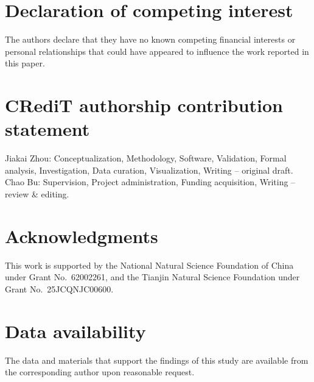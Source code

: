 \documentclass[final,5p,times,twocolumn]{elsarticle/elsarticle}
\begin{document}
\section*{Declaration of competing interest}
The authors declare that they have no known competing financial interests or personal relationships that could have appeared to influence the work reported in this paper.

\section*{CRediT authorship contribution statement}
Jiakai Zhou: Conceptualization, Methodology, Software, Validation, Formal analysis, Investigation, Data curation, Visualization, Writing -- original draft. Chao Bu: Supervision, Project administration, Funding acquisition, Writing -- review \& editing.

\section*{Acknowledgments}
This work is supported by the National Natural Science Foundation of China under Grant No.~62002261, and the Tianjin Natural Science Foundation under Grant No.~25JCQNJC00600.

\section*{Data availability}
The data and materials that support the findings of this study are available from the corresponding author upon reasonable request.
\end{document}
